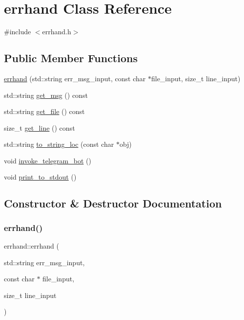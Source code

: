 \hypertarget{classerrhand}{}\section{errhand Class Reference}
\label{classerrhand}


{\ttfamily \#include $<$errhand.\+h$>$}

\subsection*{Public Member Functions}
\begin{DoxyCompactItemize}
\item 
\mbox{\hyperlink{classerrhand_a69afd61e0ebf5ee9d35f297dc2d5c086}{errhand}} (std\+::string err\+\_\+msg\+\_\+input, const char $\ast$file\+\_\+input, size\+\_\+t line\+\_\+input)
\item 
std\+::string \mbox{\hyperlink{classerrhand_a524dfc6821f703329d8801dd3298f33f}{get\+\_\+msg}} () const
\item 
std\+::string \mbox{\hyperlink{classerrhand_a1556ee8d0aaefeea3bbab73f7ae50914}{get\+\_\+file}} () const
\item 
size\+\_\+t \mbox{\hyperlink{classerrhand_a258f97d84476b21efc38827cda3e5889}{get\+\_\+line}} () const
\item 
std\+::string \mbox{\hyperlink{classerrhand_a930df1c197154853159683cb2ad55369}{to\+\_\+string\+\_\+loc}} (const char $\ast$obj)
\item 
void \mbox{\hyperlink{classerrhand_adbc86e81b391a68d2bf9a13529c977d3}{invoke\+\_\+telegram\+\_\+bot}} ()
\item 
void \mbox{\hyperlink{classerrhand_a5b4d8a74f1d0c6842526dc8b54e38dc2}{print\+\_\+to\+\_\+stdout}} ()
\end{DoxyCompactItemize}


\subsection{Constructor \& Destructor Documentation}
\mbox{\label{classerrhand_a69afd61e0ebf5ee9d35f297dc2d5c086}} 
\subsubsection{\texorpdfstring{errhand()}{errhand()}}
{\footnotesize\ttfamily errhand\+::errhand (\begin{DoxyParamCaption}\item[{std\+::string}]{err\+\_\+msg\+\_\+input,  }\item[{const char $\ast$}]{file\+\_\+input,  }\item[{size\+\_\+t}]{line\+\_\+input }\end{DoxyParamCaption})\hspace{0.3cm}{\ttfamily [inline]}}

